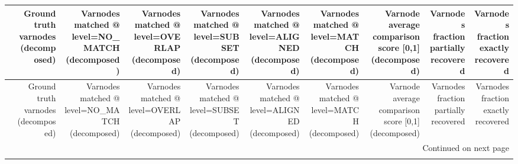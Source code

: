 \begin{longtable}{lrrrrrrrrr}
\toprule
{} &  Ground truth varnodes (decomposed) &  Varnodes matched @ level=NO\_MATCH (decomposed) &  Varnodes matched @ level=OVERLAP (decomposed) &  Varnodes matched @ level=SUBSET (decomposed) &  Varnodes matched @ level=ALIGNED (decomposed) &  Varnodes matched @ level=MATCH (decomposed) &  Varnode average comparison score {[}0,1] (decomposed) &  Varnodes fraction partially recovered &  Varnodes fraction exactly recovered \\
\midrule
\endfirsthead

\toprule
{} &  Ground truth varnodes (decomposed) &  Varnodes matched @ level=NO\_MATCH (decomposed) &  Varnodes matched @ level=OVERLAP (decomposed) &  Varnodes matched @ level=SUBSET (decomposed) &  Varnodes matched @ level=ALIGNED (decomposed) &  Varnodes matched @ level=MATCH (decomposed) &  Varnode average comparison score {[}0,1] (decomposed) &  Varnodes fraction partially recovered &  Varnodes fraction exactly recovered \\
\midrule
\endhead
\midrule
\multicolumn{10}{r}{{Continued on next page}} \\
\midrule
\endfoot


\end{longtable}
